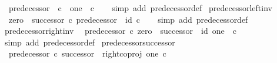 \begin{isabellebody}
\ \ {\isachardoublequoteopen}predecessor\ {\isacharcolon}{\kern0pt}\ {\isasymnat}\isactrlsub c\ {\isasymrightarrow}\ one\ {\isasymCoprod}\ {\isasymnat}\isactrlsub c{\isachardoublequoteclose}\isanewline
%
\isadelimproof
\ \ %
\endisadelimproof
%
\isatagproof
{}\isamarkupfalse%
\ {\isacharparenleft}{\kern0pt}simp\ add{\isacharcolon}{\kern0pt}\ predecessor{\isacharunderscore}{\kern0pt}def{}{\isacharparenright}{\kern0pt}%
\endisatagproof
{\isafoldproof}%
%
\isadelimproof
\isanewline
%
\endisadelimproof
\isanewline
{}\isamarkupfalse%
\ predecessor{\isacharunderscore}{\kern0pt}left{\isacharunderscore}{\kern0pt}inv{\isacharcolon}{\kern0pt}\isanewline
\ \ {\isachardoublequoteopen}{\isacharparenleft}{\kern0pt}zero\ {\isasymamalg}\ successor{\isacharparenright}{\kern0pt}\ {\isasymcirc}\isactrlsub c\ predecessor\ {\isacharequal}{\kern0pt}\ id\ {\isasymnat}\isactrlsub c{\isachardoublequoteclose}\isanewline
%
\isadelimproof
\ \ %
\endisadelimproof
%
\isatagproof
{}\isamarkupfalse%
\ {\isacharparenleft}{\kern0pt}simp\ add{\isacharcolon}{\kern0pt}\ predecessor{\isacharunderscore}{\kern0pt}def{}{\isacharparenright}{\kern0pt}%
\endisatagproof
{\isafoldproof}%
%
\isadelimproof
\isanewline
%
\endisadelimproof
\isanewline
{}\isamarkupfalse%
\ predecessor{\isacharunderscore}{\kern0pt}right{\isacharunderscore}{\kern0pt}inv{\isacharcolon}{\kern0pt}\isanewline
\ \ {\isachardoublequoteopen}predecessor\ {\isasymcirc}\isactrlsub c\ {\isacharparenleft}{\kern0pt}zero\ {\isasymamalg}\ successor{\isacharparenright}{\kern0pt}\ {\isacharequal}{\kern0pt}\ id\ {\isacharparenleft}{\kern0pt}one\ {\isasymCoprod}\ {\isasymnat}\isactrlsub c{\isacharparenright}{\kern0pt}{\isachardoublequoteclose}\isanewline
%
\isadelimproof
\ \ %
\endisadelimproof
%
\isatagproof
{}\isamarkupfalse%
\ {\isacharparenleft}{\kern0pt}simp\ add{\isacharcolon}{\kern0pt}\ predecessor{\isacharunderscore}{\kern0pt}def{}{\isacharparenright}{\kern0pt}%
\endisatagproof
{\isafoldproof}%
%
\isadelimproof
\isanewline
%
\endisadelimproof
\isanewline
{}\isamarkupfalse%
\ predecessor{\isacharunderscore}{\kern0pt}successor{\isacharcolon}{\kern0pt}\isanewline
\ \ {\isachardoublequoteopen}predecessor\ {\isasymcirc}\isactrlsub c\ successor\ {\isacharequal}{\kern0pt}\ right{\isacharunderscore}{\kern0pt}coproj\ one\ {\isasymnat}\isactrlsub c{\isachardoublequoteclose}\isanewline
%
\isadelimproof
%
\endisadelimproof
%
\isatagproof
{}\isamarkupfalse%
\ {\isacharminus}{\kern0pt}\isanewline
\ \ \isamarkupfalse%

\end{isabellebody}
